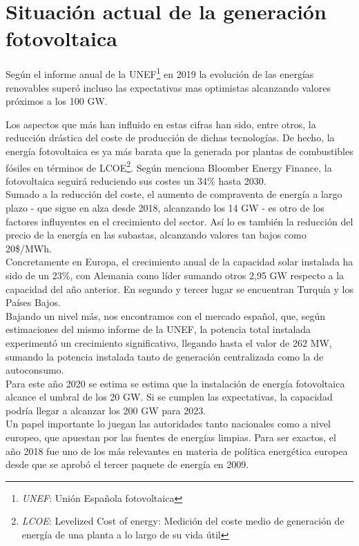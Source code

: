 
\section{Situación actual de la generación fotovoltaica}
Según el informe anual de la UNEF\footnote{\textit{UNEF}: Unión Española fotovoltaica} en 2019\cite{unef_2019} la evolución de las energías renovables superó incluso las expectativas mas optimistas alcanzando valores próximos a los 100 GW.

Los aspectos que más han influido en estas cifras han sido, entre otros, la reducción drástica del coste de producción de dichas tecnologías. De hecho, la energía fotovoltaica es ya más barata que la generada por plantas de combustibles fósiles en términos de LCOE\footnote{\textit{LCOE}: Levelized Cost of energy: Medición del coste medio de generación de energía de una planta a lo largo de su vida útil }. Según menciona Bloomber Energy Finance, la fotovoltaica seguirá reduciendo sus costes un 34\% hasta 2030.\\

Sumado a la reducción del coste, el aumento de compraventa de energía a largo plazo - que sigue en alza desde 2018, alcanzando los 14 GW - es otro de los factores influyentes en el crecimiento del sector. Así lo es también la reducción del precio de la energía en las subastas, alcanzando valores tan bajos como 20\$/MWh.\\

Concretamente en Europa, el crecimiento anual de la capacidad solar instalada ha sido de un 23\%, con Alemania como líder sumando otros 2,95 GW respecto a la capacidad del año anterior. En segundo y tercer lugar se encuentran Turquía y los Países Bajos.\\

Bajando un nivel más, nos encontramos con el mercado español, que, según estimaciones del mismo informe de la UNEF, la potencia total instalada experimentó un crecimiento significativo, llegando hasta el valor de 262 MW, sumando la potencia instalada tanto de generación centralizada como la de autoconsumo.\\

Para este año 2020 se estima se estima que la instalación de energía fotovoltaica alcance el umbral de los 20 GW. Si se cumplen las expectativas, la capacidad podría llegar a alcanzar los 200 GW para 2023.\\

Un papel importante lo juegan las autoridades tanto nacionales como a nivel europeo, que apuestan por las fuentes de energías limpias. Para ser exactos, el año 2018 fue uno de los más relevantes en materia de política energética europea desde que se aprobó el tercer paquete de energía en 2009.

